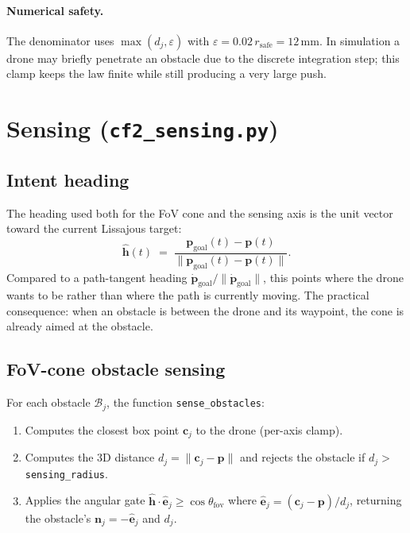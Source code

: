 \documentclass[11pt,a4paper]{article}
\newcommand{\code}[1]{\texttt{#1}}
\newcommand{\vect}[1]{\mathbf{#1}}
\begin{document}
\paragraph{Numerical safety.}
The denominator uses $\max(d_j, \varepsilon)$ with
$\varepsilon = 0.02\,r_\mathrm{safe} = 12\,\text{mm}$. In simulation a drone may
briefly penetrate an obstacle due to the discrete integration step; this clamp
keeps the law finite while still producing a very large push.

\section{Sensing (\code{cf2\_sensing.py})}

\subsection{Intent heading}

The heading used both for the FoV cone and the sensing axis is the unit vector
toward the current Lissajous target:
\[
    \hat{\vect{h}}(t)
    \;=\;
    \frac{\vect{p}_\mathrm{goal}(t) - \vect{p}(t)}{\|\vect{p}_\mathrm{goal}(t) - \vect{p}(t)\|}.
\]
Compared to a path-tangent heading $\dot{\vect{p}}_\mathrm{goal}/\|\dot{\vect{p}}_\mathrm{goal}\|$,
this points where the drone wants to be rather than where the path is
currently moving. The practical consequence: when an obstacle is between the
drone and its waypoint, the cone is already aimed at the obstacle.

\subsection{FoV-cone obstacle sensing}

For each obstacle $\mathcal{B}_j$, the function \code{sense\_obstacles}:
\begin{enumerate}[leftmargin=1.4em]
  \item Computes the closest box point $\vect{c}_j$ to the drone (per-axis
        clamp).
  \item Computes the 3D distance $d_j = \|\vect{c}_j - \vect{p}\|$ and rejects
        the obstacle if $d_j > $ \code{sensing\_radius}.
  \item Applies the angular gate $\hat{\vect{h}} \cdot \hat{\vect{e}}_j \ge
        \cos\theta_\mathrm{fov}$ where $\hat{\vect{e}}_j = (\vect{c}_j -
        \vect{p})/d_j$, returning the obstacle's $\vect{n}_j = -\hat{\vect{e}}_j$
        and $d_j$.
\end{enumerate}
\end{document}
